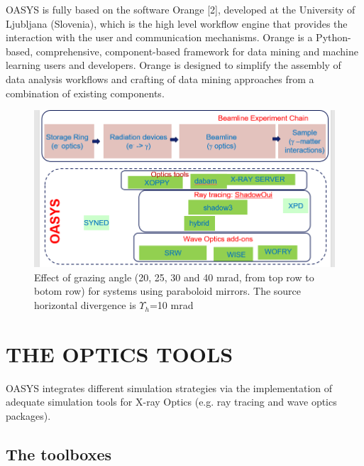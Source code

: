 \documentclass{aip-cp}
\begin{document}
OASYS is fully based on the software Orange [2], developed at the University of Ljubljana (Slovenia), which is the high level workflow engine that provides the interaction with the user and communication mechanisms. Orange is a Python-based, comprehensive, component-based framework for data mining and machine learning users and developers. Orange is designed to simplify the assembly of data analysis workflows and crafting of data mining approaches from a combination of existing components. 

% 
% 
% 
% 


\begin{figure}[h]
\includegraphics[width=14cm]{FIGURES/chain.png}
\caption{Effect of grazing angle (20, 25, 30 and 40 mrad, from top row to botom row) for systems using paraboloid mirrors. The source horizontal divergence is $\Upsilon_h$=10 mrad}
\label{figGrazing}
\end{figure}


\section{THE OPTICS TOOLS}

OASYS integrates different simulation strategies via the implementation of adequate simulation tools for X-ray Optics (e.g. ray tracing and wave optics packages). 

\subsection{The toolboxes}
\end{document}
